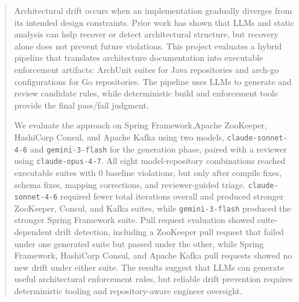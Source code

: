 \documentclass[sigconf,screen]{acmart}
\begin{document}
\begin{abstract}
\hspace*{\parindent}Architectural drift occurs when an implementation gradually diverges from its intended design constraints. Prior work has shown that LLMs and static analysis can help recover or detect architectural structure, but recovery alone does not prevent future violations. This project evaluates a hybrid pipeline that translates architecture documentation into executable enforcement artifacts: ArchUnit suites for Java repositories and arch-go configurations for Go repositories. The pipeline uses LLMs to generate and review candidate rules, while deterministic build and enforcement tools provide the final pass/fail judgment.

We evaluate the approach on Spring Framework,\linebreak Apache ZooKeeper, HashiCorp Consul, and Apache Kafka using two models, \texttt{claude-sonnet-4-6} and \texttt{gemini-3-flash} for the generation phase, paired with a reviewer using \texttt{claude-opus-4-7}. All eight model-repository combinations reached executable suites with 0 baseline violations, but only after compile fixes, schema fixes, mapping corrections, and reviewer-guided triage. \linebreak\texttt{claude-sonnet-4-6} required fewer total iterations overall and produced stronger ZooKeeper, Consul, and Kafka suites, while \texttt{gemini-3-flash} produced the stronger Spring Framework suite. Pull request evaluation showed suite-dependent drift detection, including a ZooKeeper pull request that failed under one generated suite but passed under the other, while Spring Framework, HashiCorp Consul, and Apache Kafka pull requests showed no new drift under either suite. The results suggest that LLMs can generate useful architectural enforcement rules, but reliable drift prevention requires deterministic tooling and repository-aware engineer oversight.
\end{abstract}
\end{document}

